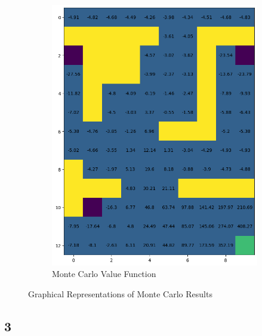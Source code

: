 \begin{figure}[H]
\begin{subfigure}[b]{0.49\textwidth}
        \centering
        \includegraphics[width=\textwidth]{assets/mc/mc_value.png}        
        \caption{Monte Carlo Value Function}
    \end{subfigure}
    \caption*{Graphical Representations of Monte Carlo Results}
\end{figure} 

\subsection*{3}